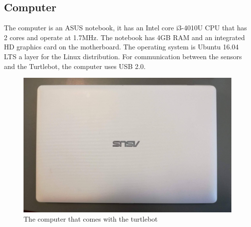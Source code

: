 \subsection{Computer} 
The computer is an ASUS notebook, it has an Intel core i3-4010U CPU that has 2 cores and operate at 1.7MHz\cite{CPU}. The notebook has 4GB RAM and an integrated HD graphics card on the motherboard\cite{ASUS}.
The operating system is Ubuntu 16.04 LTS a layer for the Linux distribution. For communication between the sensors and the Turtlebot, the computer uses USB 2.0.
\begin{figure}[h]
   \centering
    \includegraphics[width=.6\textwidth]{figures/ASUS.jpg}
    \caption{The computer that comes with the turtlebot}
    \label{fig:ASUS}
\end{figure}
